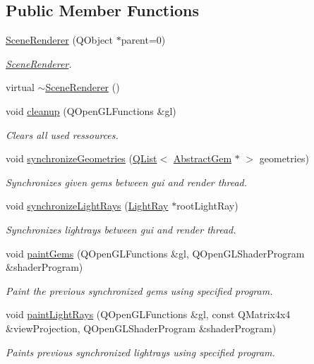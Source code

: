 \subsection*{Public Member Functions}
\begin{DoxyCompactItemize}
\item 
\hyperlink{class_scene_renderer_a12f72dc9b22e99ecdccaec38b6d2d512}{Scene\+Renderer} (Q\+Object $\ast$parent=0)
\begin{DoxyCompactList}\small\item\em \hyperlink{class_scene_renderer}{Scene\+Renderer}. \end{DoxyCompactList}\item 
virtual \hyperlink{class_scene_renderer_aceec75b5c04861c2a5c26349c2ba5748}{$\sim$\+Scene\+Renderer} ()
\item 
void \hyperlink{class_scene_renderer_a9dc118d75160651fb925410a68fef70f}{cleanup} (Q\+Open\+G\+L\+Functions \&gl)
\begin{DoxyCompactList}\small\item\em Clears all used ressources. \end{DoxyCompactList}\item 
void \hyperlink{class_scene_renderer_a0cae4e7fdd5ef1fd4d38f480521433a9}{synchronize\+Geometries} (\hyperlink{class_q_list}{Q\+List}$<$ \hyperlink{class_abstract_gem}{Abstract\+Gem} $\ast$ $>$ geometries)
\begin{DoxyCompactList}\small\item\em Synchronizes given gems between gui and render thread. \end{DoxyCompactList}\item 
void \hyperlink{class_scene_renderer_a244d4002c0fe43988f1802057ba63fd2}{synchronize\+Light\+Rays} (\hyperlink{class_light_ray}{Light\+Ray} $\ast$root\+Light\+Ray)
\begin{DoxyCompactList}\small\item\em Synchronizes lightrays between gui and render thread. \end{DoxyCompactList}\item 
void \hyperlink{class_scene_renderer_a809441cca9a5b772648f0d28e70df3fb}{paint\+Gems} (Q\+Open\+G\+L\+Functions \&gl, Q\+Open\+G\+L\+Shader\+Program \&shader\+Program)
\begin{DoxyCompactList}\small\item\em Paint the previous synchronized gems using specified program. \end{DoxyCompactList}\item 
void \hyperlink{class_scene_renderer_a6371e0e5c63e519fcf407f12d9d47262}{paint\+Light\+Rays} (Q\+Open\+G\+L\+Functions \&gl, const Q\+Matrix4x4 \&view\+Projection, Q\+Open\+G\+L\+Shader\+Program \&shader\+Program)
\begin{DoxyCompactList}\small\item\em Paints previous synchronized lightrays using specified program. \end{DoxyCompactList}\end{DoxyCompactItemize}
